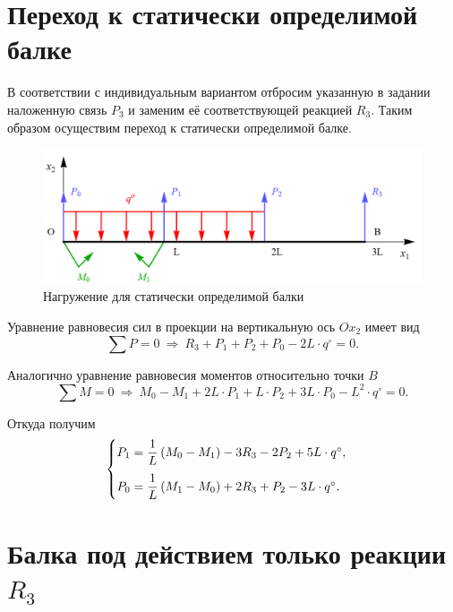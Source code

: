 \documentclass[12pt, a4paper]{article}
\begin{document}
	\section{Переход к статически определимой балке}
	
	В соответствии с индивидуальным вариантом отбросим указанную в задании наложенную связь $P_3$ и заменим её соответствующей реакцией $R_3$. Таким образом осуществим переход к статически определимой балке.
	
	\begin{figure}[!h]
		\centering
		\includegraphics[width=0.75\linewidth]{plot-3}
		\caption{Нагружение для статически определимой балки}
	\end{figure}
	
	\newpage
	
	Уравнение равновесия сил в проекции на вертикальную ось $Ox_2$ имеет вид
	\begin{equation*}
		\sum P = 0 \ \Rightarrow \ R_3 + P_1 + P_2 + P_0 - 2L \cdot q^{\circ} = 0.
	\end{equation*}
	
	Аналогично уравнение равновесия моментов относительно точки $B$
	\begin{equation*}
		\sum M = 0 \ \Rightarrow \ M_0 - M_1 + 2 L \cdot P_1 + L \cdot P_2 + 3 L \cdot P_0 - L^2 \cdot q^{\circ} = 0.
	\end{equation*}
	
	Откуда получим
	\begin{equation}
		\begin{cases} \vspace{0.75em}
			P_1 = \dfrac{1}{L} \left( M_0 - M_1 \right) - 3 R_3 - 2 P_2 + 5 L \cdot q^{\circ}, \\ 
			P_0 = \dfrac{1}{L} \left( M_1 - M_0 \right) + 2 R_3 + P_2 - 3 L \cdot q^{\circ}. \\
		\end{cases}
		\label{eqP0P1}
	\end{equation}
	
	\section{Балка под действием только реакции $R_3$}
	
\end{document}
